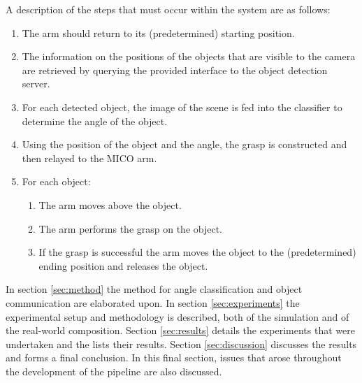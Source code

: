 \documentclass[letterpaper, 10 pt, conference]{conf/ieeeconf}  %
\begin{document}
A description of the steps that must occur within the system are as follows:
\begin{enumerate}
\item The arm should return to its (predetermined) starting position.
\item The information on the positions of the objects that are visible to the
  camera are retrieved by querying the provided interface to the object detection
  server.
\item For each detected object, the image of the scene is fed into the
  classifier to determine the angle of the object.
\item Using the position of the object and the angle, the grasp is constructed
  and then relayed to the MICO arm.
\item For each object:
  \begin{enumerate}
  \item The arm moves above the object.
  \item The arm performs the grasp on the object.
  \item If the grasp is successful the arm moves the object to the
    (predetermined) ending position and releases the object.
  \end{enumerate}
\end{enumerate}

In section \ref{sec:method} the method for angle classification and object
communication are elaborated upon. In section \ref{sec:experiments} the
experimental setup and methodology is described, both of the simulation and of
the real-world composition. Section \ref{sec:results} details the experiments
that were undertaken and the lists their results. Section \ref{sec:discussion}
discusses the results and forms a final conclusion. In this final section,
issues that arose throughout the development of the pipeline are also discussed.




\end{document}
